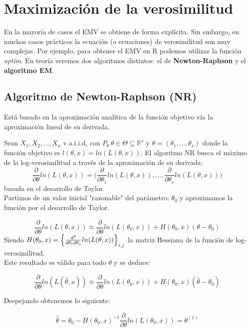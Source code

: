 
\section{Maximización de la verosimilitud}

En la mayoría de casos el EMV se obtiene de forma explícita. Sin embargo, en muchos casos prácticos la ecuación (o ecuaciones) de verosimilitud son muy complejas.
Por ejemplo, para obtener el EMV en R podemos utilizar la función \textit{optim}. En teoría veremos dos algoritmos distintos: el de \textbf{Newton-Raphson} y el \textbf{algoritmo EM}. 

\subsection{Algoritmo de Newton-Raphson (NR)}

Está basado en la aproximación analítica de la función objetivo vía la aproximación lineal de su derivada.

Sean $X_1, X_2,...,X_n$ v.a.i.i.d, con $P_\theta\ \theta\in\Theta\subseteq \mathbb{R}^s$ y $\theta=(\theta_1,...,\theta_s)$ donde la función objetivo es $l(\theta,x)=ln(L(\theta,x))$.
El algoritmo NR busca el máximo de la log-verosimilitud a través de la aproximación de su derivada: 
$$\frac{\partial}{\partial\theta}ln(L(\theta,x))=\Big(\frac{\partial}{\partial\theta_1}ln(L(\theta,x)),...,\frac{\partial}{\partial\theta_s}ln(L(\theta,x))\Big)$$
basada en el desarrollo de Taylor.\\

Partimos de un valor inicial "razonable" del parámetro: $\theta_0$ y aproximamos la función por el desarrollo de Taylor.

$$\frac{\partial}{\partial\theta}ln(L(\theta,x))\approx\frac{\partial}{\partial\theta}ln(L(\theta_0,x))+H(\theta_0,x)(\theta-\theta_0)$$
Siendo $H(\theta_0,x)=\Big{\{}\frac{d^2}{d\theta_i d\theta_j}ln(L(\theta,x))\Big{\}}_{i,j}$ la matriz Hessiana de la función de log-verosimilitud. \\

Este resultado es válido para todo $\theta$ y se deduce:

$$\frac{\partial}{\partial\theta}ln(L(\widehat\theta,x))\approx\frac{\partial}{\partial\theta}ln(L(\theta_0,x))+H(\theta_0,x)(\widehat\theta-\theta_0)$$

Despejando obtenemos lo siguiente:

$$\widehat\theta=\theta_0-H(\theta_0,x)^{-1}\frac{\partial}{\partial\theta}ln(L(\theta_0,x))=\theta^{(1)}$$

